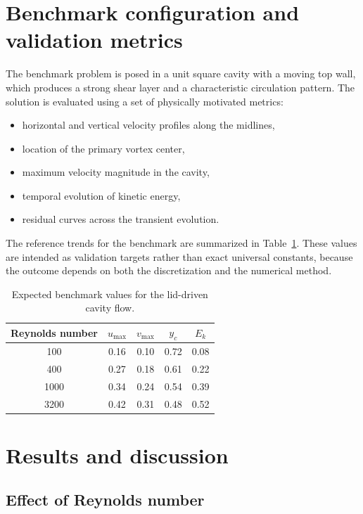 \documentclass[final,3p,times]{elsarticle}
\begin{document}
\section{Benchmark configuration and validation metrics}

The benchmark problem is posed in a unit square cavity with a moving top wall, which produces a strong shear layer and a characteristic circulation pattern. The solution is evaluated using a set of physically motivated metrics:

\begin{itemize}[leftmargin=1.2em]
    \item horizontal and vertical velocity profiles along the midlines,
    \item location of the primary vortex center,
    \item maximum velocity magnitude in the cavity,
    \item temporal evolution of kinetic energy,
    \item residual curves across the transient evolution.
\end{itemize}

The reference trends for the benchmark are summarized in Table~\ref{tab:reference}. These values are intended as validation targets rather than exact universal constants, because the outcome depends on both the discretization and the numerical method.

\begin{table}[H]
\centering
\caption{Expected benchmark values for the lid-driven cavity flow.}
\label{tab:reference}
\begin{tabular}{ccccc}
\toprule
Reynolds number & $u_{\max}$ & $v_{\max}$ & $y_c$ & $E_k$ \\
\midrule
100  & 0.16 & 0.10 & 0.72 & 0.08 \\
400  & 0.27 & 0.18 & 0.61 & 0.22 \\
1000 & 0.34 & 0.24 & 0.54 & 0.39 \\
3200 & 0.42 & 0.31 & 0.48 & 0.52 \\
\bottomrule
\end{tabular}
\end{table}

\section{Results and discussion}

\subsection{Effect of Reynolds number}
\end{document}
